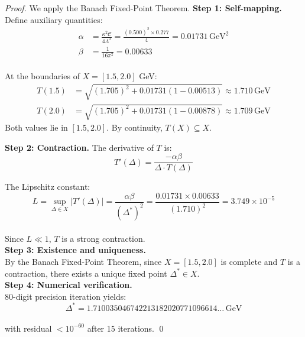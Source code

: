 \documentclass[11pt,a4paper]{article}
\theoremstyle{plain}
\theoremstyle{definition}
\begin{document}
\begin{proof}
We apply the Banach Fixed-Point Theorem.
\vspace{0.3em}
\textbf{Step 1: Self-mapping.}
\vspace{0.3em}
Define auxiliary quantities:
\begin{align}
\alpha &= \frac{\kappa^2\mathcal{C}}{4\Lambda^2} = \frac{(0.500)^2 \times 0.277}{4} = 0.01731\,\mathrm{GeV}^2 \\
\beta &= \frac{1}{16\pi^2} = 0.00633
\end{align}
\vspace{0.3em}\\
At the boundaries of $X = [1.5, 2.0]$ GeV:
\begin{align}
T(1.5) &= \sqrt{(1.705)^2 + 0.01731(1 - 0.00513)} \approx 1.710\,\mathrm{GeV} \\
T(2.0) &= \sqrt{(1.705)^2 + 0.01731(1 - 0.00878)} \approx 1.709\,\mathrm{GeV}
\end{align}
Both values lie in $[1.5, 2.0]$. By continuity, $T(X) \subseteq X$.
\newpage

\textbf{Step 2: Contraction.}
The derivative of $T$ is:
\begin{equation}
T'(\Delta) = \frac{-\alpha\beta}{\Delta \cdot T(\Delta)}
\end{equation}

The Lipschitz constant:
\begin{equation}
L = \sup_{\Delta \in X}|T'(\Delta)|
= \frac{\alpha\beta}{(\Delta^*)^2}
= \frac{0.01731 \times 0.00633}{(1.710)^2} = \boxed{3.749 \times 10^{-5}}
\end{equation}
\vspace{0.3em}\\
Since $L \ll 1$, $T$ is a strong contraction.
\vspace{0.7em}\\
\textbf{Step 3: Existence and uniqueness.}
\vspace{0.3em}\\
By the Banach Fixed-Point Theorem, since $X = [1.5, 2.0]$ is complete and $T$ is a contraction, there exists a unique fixed point $\Delta^* \in X$.
\vspace{0.7em}\\
\textbf{Step 4: Numerical verification.}
\vspace{0.8em}\\
80-digit precision iteration yields:
\begin{equation}
\Delta^* = 1.710035046742213182020771096614\ldots\,\mathrm{GeV}
\end{equation}\\
with residual $< 10^{-60}$ after 15 iterations. \qed
\end{proof}
\end{document}
